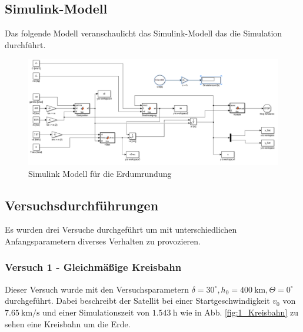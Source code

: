 \documentclass[]{scrartcl}
\begin{document}
\subsection{Simulink-Modell}

Das folgende Modell veranschaulicht das Simulink-Modell das die Simulation durchführt.

\begin{figure}[H]
\centering
\includegraphics[width=1\linewidth]{./Weltraum_1}
\caption{Simulink Modell für die Erdumrundung}
\label{fig:Weltraum}
\end{figure}

\subsection{Versuchsdurchführungen}
Es wurden drei Versuche durchgeführt um mit unterschiedlichen Anfangsparametern diverses Verhalten zu provozieren.

\subsubsection{Versuch 1 - Gleichmäßige Kreisbahn}

Dieser Versuch wurde mit den Versuchsparametern $\delta = 30^\circ, h_0 = \SI{400}{\km}, \Theta = 0^\circ $ durchgeführt. Dabei beschreibt der Satellit bei einer Startgeschwindigkeit $v_0$ von $ \SI[per-mode=fraction]{7,65}{\km\per\second}$ und einer Simulationszeit von $ \SI{1,543}{\hour}$  wie in Abb. \ref{fig:1_Kreisbahn} zu sehen eine Kreisbahn um die Erde.
\end{document}
